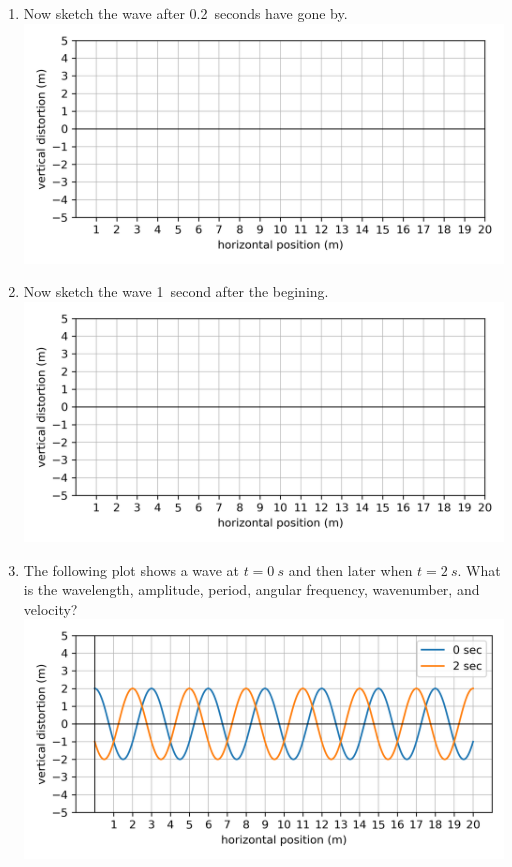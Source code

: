 \begin{enumerate}
	\item
	Now sketch the wave after \SI{0.2}{seconds} have gone by.\\
	\includegraphics[scale=1]{week13-blank-plot.png}
	
	\item
	Now sketch the wave \SI{1}{second} after the begining.\\
	\includegraphics[scale=1]{week13-blank-plot.png}
	
	\item
	The following plot shows a wave at $t=\SI{0}{s}$ and then later when $t=\SI{2}{s}$. What is the wavelength, amplitude, period, angular frequency, wavenumber, and velocity?\\
	\includegraphics[scale=1]{week13-plot-2-times.png}
	

\end{enumerate}
